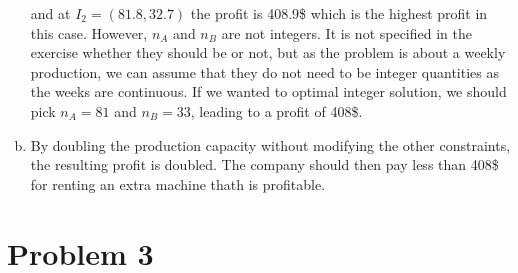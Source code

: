 \documentclass[a4paper, 10pt, twoside]{article}
\begin{document}
\begin{enumerate}[a)]
          and at $I_2 = (81.8, 32.7)$ the profit is 408.9\$ which is the highest profit in this case. However, $n_A$ and $n_B$ are not integers. It is not specified in the exercise whether they should be or not, but as the problem is about a weekly production, we can assume that they do not need to be integer quantities as the weeks are continuous. If we wanted to optimal integer solution, we should pick $n_A = 81$ and $n_B = 33$, leading to a profit of 408\$.

    \item By doubling the production capacity without modifying the other constraints, the resulting profit is doubled. The company should then pay less than 408\$ for renting an extra machine thath is profitable.
\end{enumerate}

\section*{Problem 3}
\end{document}
